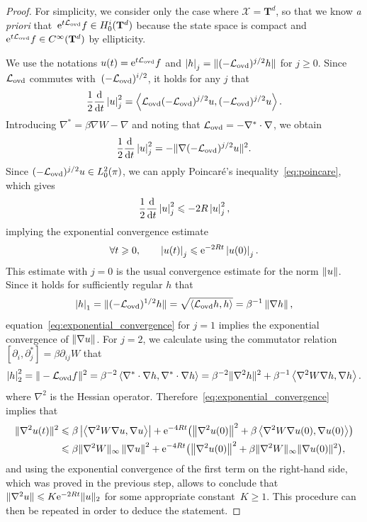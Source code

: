 \documentclass[11pt,a4paper]{article}
\newcommand{\e}{\mathrm{e}}
\newcommand{\commut}[2]{[#1, #2]}
\newcommand{\torus}{\mathbf T}
\newcommand{\grad}{\nabla}
\newcommand{\hess}{\nabla^2}
\theoremstyle{plain}
\numberwithin{equation}{section}
\renewcommand{\leq}{\leqslant}
\renewcommand{\geq}{\geqslant}
\begin{document}
\begin{proof}
    For simplicity, we consider only the case where $\mathcal X = \torus^d$,
    so that we know \emph{a priori} that~$\e^{t \mathcal L_{\rm ovd}} f \in H^i_0(\torus^d)$ because
    the state space is compact and $\e^{t \mathcal L_{\rm ovd}} f \in C^{\infty}(\torus^d)$ by ellipticity.

    We use the notations $u(t) = \e^{t \mathcal L_{\rm ovd}} f$ and
     $\seminorm{h}_j = \norm*{(- \mathcal L_{\rm ovd})^{j/2} h}$ for $j \geq 0$.
    Since $\mathcal L_{\rm ovd}$ commutes with~$(-\mathcal L_{\rm ovd})^{i/2}$,
    it holds for any $j$ that
    \[
        \frac{1}{2} \derivative*{1}{t} \seminorm{u}_j^2 = \ip{\mathcal L_{\rm ovd} (-\mathcal L_{\rm ovd})^{j/2} u}{(- \mathcal L_{\rm ovd})^{j/2} u}.
    \]
    Introducing $\grad^* = \beta \grad W - \grad$
    and noting that $\mathcal L_{\rm ovd} = - \grad^* \cdot \grad$,
    we obtain
    \[
        \frac{1}{2} \derivative*{1}{t} \seminorm{u}_j^2 = - \norm*{\grad (-\mathcal L_{\rm ovd})^{j/2} u}^2.
    \]
    Since $(-\mathcal L_{\rm ovd})^{j/2} u \in L^2_0(\pi)$,
    we can apply Poincar\'e's inequality~\eqref{eq:poincare},
    which gives
    \[
        \frac{1}{2} \derivative*{1}{t} \seminorm{u}_j^2 \leq - 2R \seminorm{u}_j^2,
    \]
    implying the exponential convergence estimate
    \begin{equation}
        \label{eq:exponential_convergence}
        \forall t \geq 0, \qquad
        \seminorm{u(t)}_j \leq \e^{- 2 R t} \seminorm{u(0)}_j.
    \end{equation}
    This estimate with $j = 0$ is the usual convergence estimate for the norm $\norm{u}$.
    Since it holds for sufficiently regular $h$ that
    \[
        \seminorm{h}_1 = \norm*{(- \mathcal L_{\rm ovd})^{1/2} h} = \sqrt{\ip{\mathcal L_{\rm ovd} h}{h}} = \beta^{-1} \norm{\grad h},
    \]
    equation~\eqref{eq:exponential_convergence} for $j = 1$ implies the exponential convergence of $\norm{\grad u}$.
    For $j = 2$, we calculate using the commutator relation $\commut{\partial_i}{\partial_j^*} = \beta  \partial_{ij} W$ that
    \[
        \seminorm{h}_2^2 = \norm*{- \mathcal L_{\rm ovd}f}^2
        = \beta^{-2} \ip{\grad^* \cdot \grad h}{\grad^* \cdot \grad h}
        = \beta^{-2} \norm*{\grad^2 h}^2 + \beta^{-1} \ip{\hess W \grad h}{\grad h}.
    \]
    where $\grad^2$ is the Hessian operator.
    Therefore~\eqref{eq:exponential_convergence} implies that
    \begin{align*}
        \norm*{\hess u(t)}^2
        &\leq \beta \abs{\ip{\hess W \grad u}{\grad u}} + \e^{-4Rt} \bigl( \norm{\grad^2 u(0)}^2 + \beta \ip{\grad^2 W \grad u(0)}{\grad u(0)} \bigr) \\
        &\leq \beta \norm*{\grad^2 W}_{\infty} \norm{\grad u}^2 + \e^{-4Rt} \bigl( \norm{\grad^2 u(0)}^2 + \beta \norm*{\grad^2 W}_{\infty} \norm*{\grad u(0)}^2 \bigr),
    \end{align*}
    and using the exponential convergence of the first term on the right-hand side,
    which was proved in the previous step,
    allows to conclude that $\norm*{\grad^2 u} \leq K \e^{-2 Rt} \norm*{u}[2]$ for some appropriate constant~$K \geq 1$.
    This procedure can then be repeated in order to deduce the statement.
\end{proof}
\end{document}
